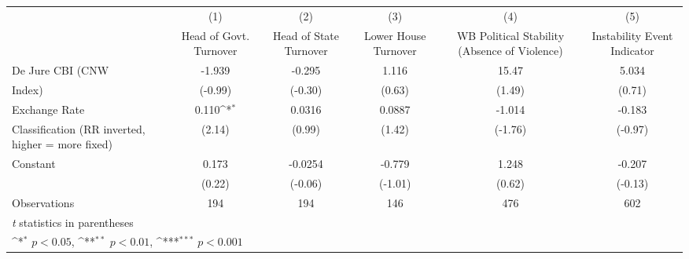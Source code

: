{
\def\sym#1{\ifmmode^{#1}\else\(^{#1}\)\fi}
\begin{tabular}{l*{5}{c}}
\hline\hline
                    &\multicolumn{1}{c}{(1)}&\multicolumn{1}{c}{(2)}&\multicolumn{1}{c}{(3)}&\multicolumn{1}{c}{(4)}&\multicolumn{1}{c}{(5)}\\
                    &\multicolumn{1}{c}{Head of Govt. Turnover}&\multicolumn{1}{c}{Head of State Turnover}&\multicolumn{1}{c}{Lower House Turnover}&\multicolumn{1}{c}{WB Political Stability (Absence of Violence)}&\multicolumn{1}{c}{Instability Event Indicator}\\
\hline
De Jure CBI (CNW    &      -1.939         &      -0.295         &       1.116         &       15.47         &       5.034         \\
Index)              &     (-0.99)         &     (-0.30)         &      (0.63)         &      (1.49)         &      (0.71)         \\
[1em]
Exchange Rate       &       0.110\sym{*}  &      0.0316         &      0.0887         &      -1.014         &      -0.183         \\
Classification (RR inverted, higher = more fixed)&      (2.14)         &      (0.99)         &      (1.42)         &     (-1.76)         &     (-0.97)         \\
[1em]
Constant            &       0.173         &     -0.0254         &      -0.779         &       1.248         &      -0.207         \\
                    &      (0.22)         &     (-0.06)         &     (-1.01)         &      (0.62)         &     (-0.13)         \\
\hline
Observations        &         194         &         194         &         146         &         476         &         602         \\
\hline\hline
\multicolumn{6}{l}{\footnotesize \textit{t} statistics in parentheses}\\
\multicolumn{6}{l}{\footnotesize \sym{*} \(p<0.05\), \sym{**} \(p<0.01\), \sym{***} \(p<0.001\)}\\
\end{tabular}
}

